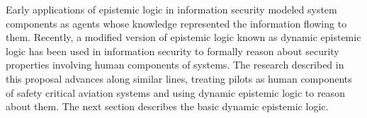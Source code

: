 



Early applications of epistemic logic in information security modeled system components as agents whose knowledge represented the information flowing to them. Recently, a modified version of epistemic logic known as dynamic epistemic logic has been used in information security to formally reason about security properties involving human components of systems. The research described in this proposal advances along similar lines, treating pilots as human components of safety critical aviation systems and using dynamic epistemic logic to reason about them. The next section describes the basic dynamic epistemic logic.

